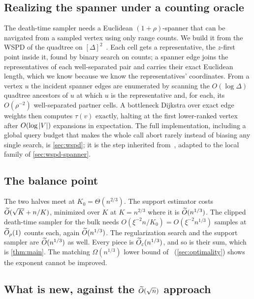 \subsection{Realizing the spanner under a counting oracle}\label{sec:ov-wspd}

The death-time sampler needs a Euclidean $(1+\rho)$-spanner that can be navigated from a sampled vertex
using only range counts. We build it from the WSPD of the quadtree on
$[\Delta]^2$~\cite{CK95,HarPeled11}. Each cell gets a representative, the $z$-first point inside it, found
by binary search on counts; a spanner edge joins the representatives of each well-separated pair and
carries their exact Euclidean length, which we know because we know the representatives' coordinates. From
a vertex $u$ the incident spanner edges are enumerated by scanning the $O(\log\Delta)$ quadtree ancestors
of $u$ at which $u$ is the representative and, for each, its $O(\rho^{-2})$ well-separated partner cells.
A bottleneck Dijkstra over exact edge weights then computes $\tau(v)$ exactly, halting at the first
lower-ranked vertex after $O(\log\left|V\right|)$ expansions in expectation. The full implementation, including a
global query budget that makes the whole call abort rarely instead of biasing any single search, is
\cref{sec:wspd}; it is the step inherited from~\cite{DMOSW25}, adapted to the local family of
\cref{sec:wspd-spanner}.

\subsection{The balance point}\label{sec:ov-balance}

The two halves meet at $K_0=\Theta(n^{2/3})$. The support estimator costs $\widetilde{O}(\sqrt K+n/K)$, minimized
over $K$ at $K=n^{2/3}$ where it is $\widetilde{O}(n^{1/3})$. The clipped death-time sampler for the bulk needs
$O(\xi^{-2}n/K_0)=O(\xi^{-2}n^{1/3})$ samples at $\widetilde{O}_\rho(1)$ counts each, again $\widetilde{O}(n^{1/3})$. The
regularization search and the support sampler are $\widetilde{O}(n^{1/3})$ as well. Every piece is $\widetilde{O}_\varepsilon(
n^{1/3})$, and so is their sum, which is \cref{thm:main}. The matching $\Omega(n^{1/3})$ lower bound
of~\cite{DMOSW25} (\cref{sec:optimality}) shows the exponent cannot be improved.

\subsection{What is new, against the \texorpdfstring{$\widetilde{O}(\sqrt n)$}{Otil(sqrt n)} approach}
\label{sec:ov-compare}

